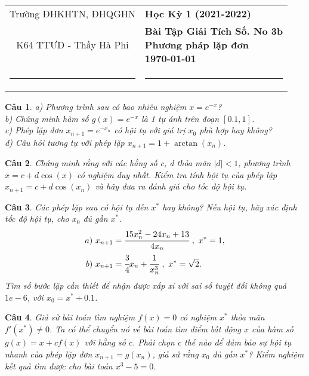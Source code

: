\documentclass[11pt]{article}
\newtheorem{bt}{Câu}
\begin{document}
\begin{tabular*}
	{\linewidth}{c>{\centering\hspace{0pt}} p{}}
	Trường ĐHKHTN, ĐHQGHN & {\bf Học Kỳ 1 (2021-2022)}
	\tabularnewline
	K64 TTƯD - Thầy Hà Phi & {\bf Bài Tập Giải Tích Số. No 3b \\ Phương pháp lặp đơn \\ \today}
	\tabularnewline
	\rule{1in}{1pt}  \small  & \rule{2in}{1pt} %
	\tabularnewline
	
\end{tabular*}
%

\begin{bt} %
a) Phương trình sau có bao nhiêu nghiệm $x=e^{-x}$? \\
b) Chứng minh hàm số $g(x) = e^{-x}$ là 1 tự ánh trên đoạn $[0.1,1]$. \\
c) Phép lặp đơn $x_{n+1}=e^{-x_n}$ có hội tụ với giá trị $x_0$ phù hợp hay không? \\
d) Câu hỏi tương tự với phép lặp $x_{n+1} = 1 + \arctan(x_n)$.
\end{bt}

\begin{bt} %
Chứng minh rằng với các hằng số c, d thỏa mãn $|d|<1$, phương trình $x=c+d \cos(x)$ có nghiệm duy nhất. Kiểm tra tính hội tụ của phép lặp $x_{n+1}=c+d \cos(x_n)$ và hãy đưa ra đánh giá cho tốc độ hội tụ.
\end{bt}

\begin{bt} %
Các phép lặp sau có hội tụ đến $x^*$ hay không? Nếu hội tụ, hãy xác định tốc độ hội tụ, cho $x_0$ đủ gần $x^*$.
%
\begin{align*}
a) \  x_{n+1} &= \cfrac{15 x_n^2-24x_n+13}{4x_n} \ , \ x^*=1, \\
b) \  x_{n+1} &= \cfrac{3}{4} x_n + \cfrac{1}{x_n^3} \ , \ x^*=\sqrt{2}.
\end{align*}
%
Tìm số bước lặp cần thiết để nhận được xấp xỉ với sai số tuyệt đối không quá $1e-6$, với $x_0 = x^* + 0.1$. 
\end{bt}

\begin{bt} %
Giả sử bài toán tìm nghiệm $f(x)=0$ có nghiệm $x^*$ thỏa mãn $f'(x^*)\not=0$. Ta có thể chuyển nó về bài toán tìm điểm bất động $x$ của hàm số $g(x)=x+cf(x)$ với hằng số $c$. Phải chọn $c$ thế nào để đảm bảo sự hội tụ nhanh của phép lặp đơn $x_{n+1}=g(x_n)$, giả sử rằng $x_0$ đủ gần $x^*$? Kiểm nghiệm kết quả tìm được cho bài toán $x^3-5=0$.
\end{bt}
\end{document}
